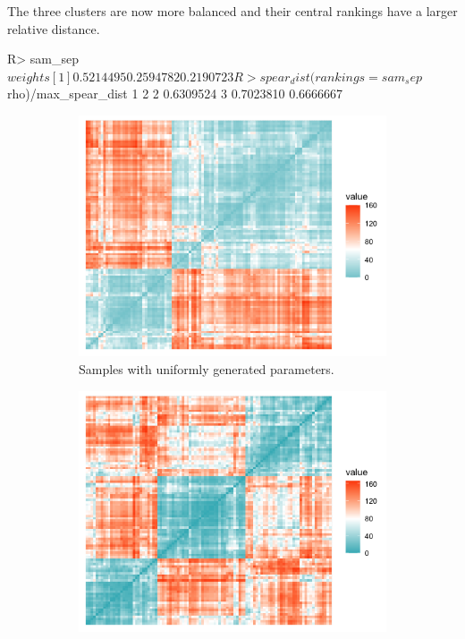 The three clusters are now more balanced and their central rankings have a larger relative distance.
\begin{example}
R> sam_sep$weights
[1] 0.5214495 0.2594782 0.2190723

R> spear_dist(rankings = sam_sep$rho)/max_spear_dist
     1         2
2 0.6309524          
3 0.7023810 0.6666667
\end{example}
\begin{figure}[t]
     \centering
     \begin{subfigure}[b]{0.49\textwidth}
         \centering
         \includegraphics[width=\textwidth]{figures/RJ2025_paper_dist1_new.png}
         \caption{{Samples with uniformly generated parameters.}}
         \label{fig:s1a}
     \end{subfigure}
     \hfill
     \begin{subfigure}[b]{0.49\textwidth}
         \centering
         \includegraphics[width=\textwidth]{figures/RJ2025_paper_dist2_new.png}

\end{subfigure}
\end{figure}
